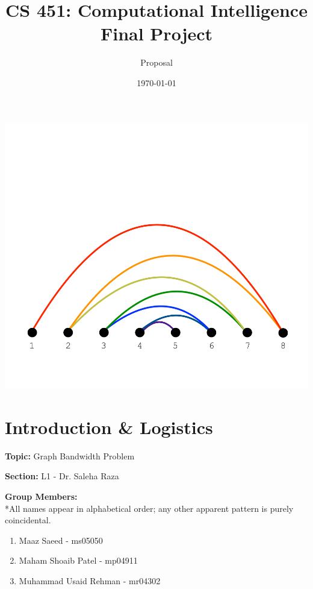 \documentclass[a4paper,11pt]{article}
\title{CS 451: Computational Intelligence \\ \Large Final Project}
\author{Proposal}
\date{\today}
\begin{document}
\maketitle
\begin{center}
    \includegraphics[scale=0.4]{cover.png}    
\end{center}


\newpage
\begin{spacing}{0.01}
    \tableofcontents
\end{spacing}


\newpage
\section{Introduction \& Logistics}
\textbf{Topic:} Graph Bandwidth Problem 

\textbf{Section:} L1 - Dr. Saleha Raza 

\textbf{Group Members:} 
\vspace{0.4 em} \\
*All names appear in alphabetical order; any other apparent pattern is purely coincidental.
\begin{enumerate}
    \item Maaz Saeed - ms05050
    \item Maham Shoaib Patel - mp04911
    \item Muhammad Usaid Rehman - mr04302
\end{enumerate}
\end{document}
